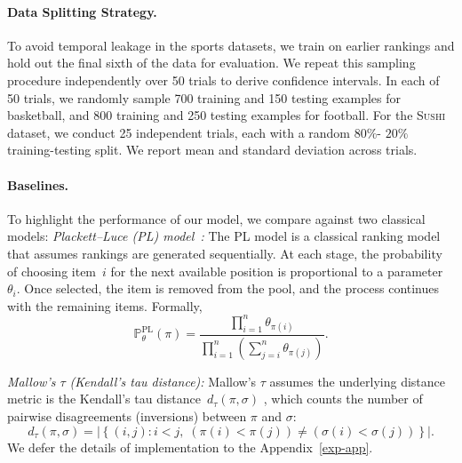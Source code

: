 \documentclass{article}
\begin{document}
        

\paragraph{Data Splitting Strategy.}
To avoid temporal leakage in the sports datasets, we train on earlier rankings and hold out the final sixth of the data for evaluation. We repeat this sampling procedure independently over 50 trials to derive confidence intervals. In each of 50 trials, we randomly sample 700 training and 150 testing examples for basketball, and 800 training and 250 testing examples for football.
For the \textsc{Sushi} dataset, we conduct 25 independent trials, each with a random  $80\%$- $20\%$  training-testing split. We report mean and standard deviation across trials.

\paragraph{Baselines.}
To highlight the performance of our model, we compare against two classical models:
    \textit{Plackett--Luce (PL) model~\cite{plackett1975analysis}:} 
    The PL model is a classical ranking model that assumes rankings are generated sequentially. At each stage, the probability of choosing item~$i$ for the next available position is proportional to a parameter~$\theta_i$. Once selected, the item is removed from the pool, and the process continues with the remaining items. Formally,
    \[
    \mathbb{P}_{\theta}^{\mathrm{PL}}(\pi) = \frac{\prod_{i=1}^{n} \theta_{\pi(i)}}{\prod_{i=1}^{n} \left( \sum_{j=i}^n \theta_{\pi(j)} \right)}.
    \]

    \textit{Mallow's $\tau$ (Kendall's tau distance):} 
    Mallow's $\tau$ assumes the underlying distance metric is
    the Kendall's tau distance~$d_{\tau}(\pi, \sigma)$ \cite{kendall1938new}, which counts the number of pairwise disagreements (inversions) between $\pi$ and $\sigma$:
    \[
    d_{\tau}(\pi, \sigma) = 
    \left| \left\{ (i, j) : i < j,\; (\pi(i) < \pi(j)) \ne (\sigma(i) < \sigma(j)) \right\} \right|.
    \]
We defer the details of implementation to the Appendix~\ref{exp-app}.
\end{document}
